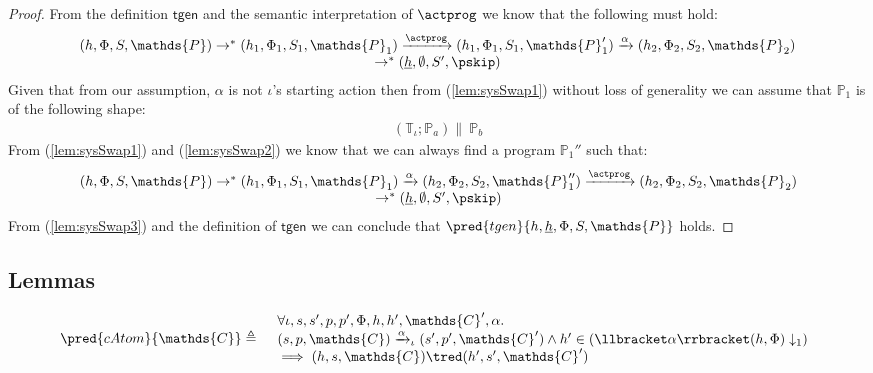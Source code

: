 \begin{lem}
\begin{proof}
	From the definition $\mathsf{tgen}$ and the semantic interpretation of $\actprog$ we know that the following must hold:
	\begin{gather}
		\label{lem:sysSwap1}
		\begin{array}{c}
			(h, \Phi, S, \mathds{P}) \rightarrow^* (h_1, \Phi_1, S_1, \mathds{P}_1) \xrightarrow{\actprog} (h_1, \Phi_1, S_1, \mathds{P}_1') \xrightarrow{\alpha} (h_2, \Phi_2, S_2, \mathds{P}_2) \\ \rightarrow^* (\underline{h}, \emptyset, S', \pskip)
		\end{array}
	\end{gather}
	Given that from our assumption, $\alpha$ is not $\iota$'s starting action then from (\ref{lem:sysSwap1}) without loss of generality we can assume that $\mathds{P}_1$ is of the following shape:
	\begin{gather}
		\label{lem:sysSwap2}
		\left( \mathds{T}_\iota ; \mathds{P}_a \right) \|\ \mathds{P}_b
	\end{gather}
	From (\ref{lem:sysSwap1}) and (\ref{lem:sysSwap2}) we know that we can always find a program $\mathds{P}_1''$ such that:
	\begin{gather}
		\label{lem:sysSwap3}
		\begin{array}{c}
			(h, \Phi, S, \mathds{P}) \rightarrow^* (h_1, \Phi_1, S_1, \mathds{P}_1) \xrightarrow{\alpha} (h_2, \Phi_2, S_2, \mathds{P}_1'') \xrightarrow{\actprog} (h_2, \Phi_2, S_2, \mathds{P}_2) \\ \rightarrow^* (\underline{h}, \emptyset, S', \pskip)
		\end{array}
	\end{gather}
	From (\ref{lem:sysSwap3}) and the definition of $\mathsf{tgen}$ we can conclude that $\pred{tgen}{h, \underline{h}, \Phi, S, \mathds{P}}$ holds.
	\end{proof}
\end{lem}

\subsection{Lemmas}

\lem \label{lem:catom}
\[
\begin{array}{r l}
	\pred{cAtom}{\mathds{C}} \triangleq&
	\begin{array}{l}
	\forall \iota, s, s', p, p', \Phi, h, h', \mathds{C}', \alpha \ldotp \\
	(s, p, \mathds{C}) \xrightarrow{\alpha}_\iota (s', p', \mathds{C}') \land h' \in \left( \llbracket \alpha \rrbracket(h, \Phi) \downarrow_1 \right) \\
	\implies
	(h, s, \mathds{C}) \tred (h', s', \mathds{C}')
	\end{array}
\end{array}
\]

